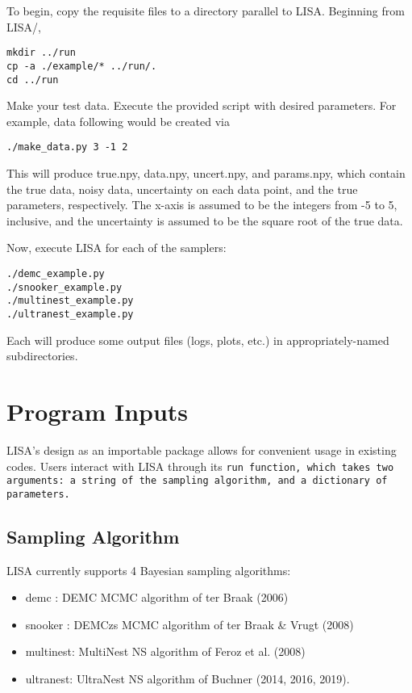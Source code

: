 \documentclass[letterpaper, 12pt]{article}
\begin{document}
\noindent To begin, copy the requisite files to a directory parallel to LISA. 
Beginning from LISA/, 
\begin{verbatim}
mkdir ../run
cp -a ./example/* ../run/.
cd ../run
\end{verbatim}

\noindent Make your test data.  Execute the provided script with 
desired parameters.  For example, data following  
would be created via
\begin{verbatim}
./make_data.py 3 -1 2
\end{verbatim}
\noindent This will produce true.npy, data.npy, uncert.npy, and params.npy, 
which contain the true data, noisy data, uncertainty on each data point, and 
the true parameters, respectively.  The x-axis is assumed to be the integers 
from -5 to 5, inclusive, and the uncertainty is assumed to be the square root 
of the true data.

\noindent Now, execute LISA for each of the samplers:

\begin{verbatim}
./demc_example.py
./snooker_example.py
./multinest_example.py
./ultranest_example.py
\end{verbatim}

\noindent Each will produce some output files (logs, plots, etc.) in appropriately-named 
subdirectories.


\section{Program Inputs}
\label{sec:inputs}

LISA's design as an importable package allows for convenient usage in existing 
codes.  Users interact with LISA through its \tt{run} function, which takes two 
arguments: a string of the sampling algorithm, and a dictionary of parameters.

\subsection{Sampling Algorithm}

LISA currently supports 4 Bayesian sampling algorithms:
\begin{itemize}
\item demc   : DEMC MCMC algorithm of ter Braak (2006)
\item snooker  : DEMCzs MCMC algorithm of ter Braak & Vrugt (2008)
\item multinest: MultiNest NS algorithm of Feroz et al. (2008)
\item ultranest: UltraNest NS algorithm of Buchner (2014, 2016, 2019).
\end{itemize}
\end{document}
